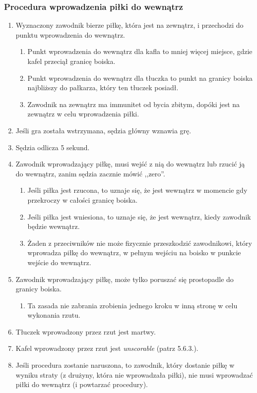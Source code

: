 \documentclass[11pt,a4paper]{article}
\begin{document}
\subsubsection{Procedura wprowadzenia piłki do wewnątrz}
\begin{enumerate}
  \item Wyznaczony zawodnik bierze piłkę, która jest na zewnątrz, i przechodzi do punktu wprowadzenia do wewnątrz.
  \begin{enumerate}
    \item Punkt wprowadzenia do wewnątrz dla kafla to mniej więcej miejsce, gdzie kafel przeciął granicę boiska.
    \item Punkt wprowadzenia do wewnątrz dla tłuczka to punkt na granicy boiska najbliższy do pałkarza, który ten tłuczek posiadł.
    \item Zawodnik na zewnątrz ma immunitet od bycia zbitym, dopóki jest na zewnątrz w celu wprowadzenia piłki.
  \end{enumerate}
  \item Jeśli gra została wstrzymana, sędzia główny wznawia grę.
  \item Sędzia odlicza 5 sekund.
  \item Zawodnik wprowadzający piłkę, musi wejść z nią do wewnątrz lub rzucić ją do wewnątrz, zanim sędzia zacznie mówić ,,zero''.
  \begin{enumerate}
    \item Jeśli piłka jest rzucona, to uznaje się, że jest wewnątrz w momencie gdy przekroczy w całości granicę boiska.
    \item Jeśli piłka jest wniesiona, to uznaje się, że jest wewnątrz, kiedy zawodnik będzie wewnątrz.
    \item Żaden z przeciwników nie może fizycznie przeszkodzić zawodnikowi, który wprowadza piłkę do wewnątrz, w pełnym wejściu na boisko w punkcie wejście do wewnątrz.
  \end{enumerate}
  \item Zawodnik wprowadzający piłkę, może tylko poruszać się prostopadle do granicy boiska.
  \begin{enumerate}
    \item Ta zasada nie zabrania zrobienia jednego kroku w inną stronę w celu wykonania rzutu.
  \end{enumerate}
  \item Tłuczek wprowadzony przez rzut jest martwy.
  \item Kafel wprowadzony przez rzut jest \emph{unscorable} (patrz 5.6.3.). %
  \item Jeśli procedura zostanie naruszona, to zawodnik, który dostanie piłkę w wyniku straty (z drużyny, która nie wprowadzała piłki), nie musi wprowadzać piłki do wewnątrz (i powtarzać procedury).
\end{enumerate}
\end{document}
